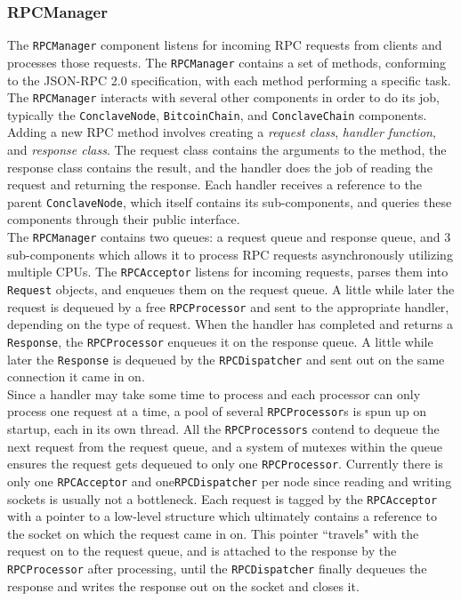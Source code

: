 \documentclass{report}
\begin{document}
			\subsubsection{RPCManager}
			The \texttt{RPCManager} component listens for incoming RPC requests from clients and processes those requests. The \texttt{RPCManager} contains a set of methods, conforming to the JSON-RPC 2.0\cite{jsonrpc2} specification, with each method performing a specific task. The \texttt{RPCManager} interacts with several other components in order to do its job, typically the \texttt{ConclaveNode}, \texttt{BitcoinChain}, and \texttt{ConclaveChain} components. \\
			
			Adding a new RPC method involves creating a \textit{request class}, \textit{handler function}, and \textit{response class}.  The request class contains the arguments to the method, the response class contains the result, and the handler does the job of reading the request and returning the response. Each handler receives a reference to the parent \texttt{ConclaveNode}, which itself contains its sub-components, and queries these components through their public interface. \\
			
			The \texttt{RPCManager} contains two queues: a request queue and response queue, and 3 sub-components which allows it to process RPC requests asynchronously utilizing multiple CPUs. The \texttt{RPCAcceptor} listens for incoming requests, parses them into \texttt{Request} objects, and enqueues them on the request queue. A little while later the request is dequeued by a free \texttt{RPCProcessor} and sent to the appropriate handler, depending on the type of request. When the handler has completed and returns a \texttt{Response}, the \texttt{RPCProcessor} enqueues it on the response queue. A little while later the \texttt{Response} is dequeued by the \texttt{RPCDispatcher} and sent out on the same connection it came in on. \\
			
			Since a handler may take some time to process and each processor can only process one request at a time, a pool of several \texttt{RPCProcessor}s is spun up on startup, each in its own thread. All the \texttt{RPCProcessors} contend to dequeue the next request from the request queue, and a system of mutexes within the queue ensures the request gets dequeued to only one \texttt{RPCProcessor}. Currently there is only one \texttt{RPCAcceptor} and one\texttt{RPCDispatcher} per node since reading and writing sockets is usually not a bottleneck. Each request is tagged by the \texttt{RPCAcceptor} with a pointer to a low-level structure which ultimately contains a reference to the socket on which the request came in on. This pointer ``travels" with the request on to the request queue, and is attached to the response by the \texttt{RPCProcessor} after processing, until the \texttt{RPCDispatcher} finally dequeues the response and writes the response out on the socket and closes it. \\
			
\end{document}
